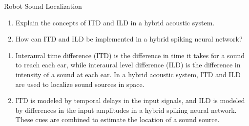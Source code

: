 \documentclass{article}
\begin{document}
\begin{exercise}{Robot Sound Localization}
  \begin{enumerate}
    \item Explain the concepts of ITD and ILD in a hybrid acoustic system.
    \item How can ITD and ILD be implemented in a hybrid spiking neural network?
  \end{enumerate}

  \begin{solution}
    \begin{enumerate}
      \item Interaural time difference (ITD) is the difference in time it takes for a sound to reach each ear, while interaural level difference (ILD) is the difference in intensity of a sound at each ear. In a hybrid acoustic system, ITD and ILD are used to localize sound sources in space.
      \item ITD is modeled by temporal delays in the input signals, and ILD is modeled by differences in the input amplitudes in a hybrid spiking neural network. These cues are combined to estimate the location of a sound source.
    \end{enumerate}
  \end{solution}
\end{exercise}
\end{document}
